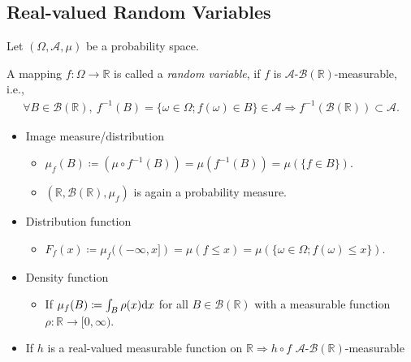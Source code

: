 \documentclass[oneside,11pt]{book}
\numberwithin{equation}{section}
\begin{document}
\subsection{Real-valued Random Variables}
Let $(\Omega,\mathcal{A},\mu)$ be a probability space.

A mapping $f:\Omega\to\mathbb{R}$ is called a \textit{random variable}, if $f$ is $\mathcal{A}$-$\mathcal{B}(\mathbb{R})$-measurable, i.e.,
\begin{align*}
    \forall B\in\mathcal{B}(\mathbb{R}),\ f^{-1}(B) = \{\omega\in\Omega;f(\omega)\in B\}\in\mathcal{A}\Rightarrow f^{-1}(\mathcal{B}(\mathbb{R}))\subset\mathcal{A}.
\end{align*}
\begin{itemize}
    \item Image measure/distribution
    \begin{itemize}
        \item $\mu_f(B)\coloneqq(\mu\circ f^{-1}(B)) = \mu(f^{-1}(B)) = \mu(\{f\in B\})$.
        \item $(\mathbb{R},\mathcal{B}(\mathbb{R}),\mu_f)$ is again a probability measure.
    \end{itemize}
    \item Distribution function
    \begin{itemize}
        \item $F_f(x)\coloneqq\mu_f((-\infty,x]) = \mu(f\le x) = \mu(\{\omega\in\Omega;f(\omega)\le x\})$.
    \end{itemize}
    \item Density function
    \begin{itemize}
        \item If $\mu_f(B)\coloneqq\int_B \rho(x){\rm d}x$ for all $B\in\mathcal{B}(\mathbb{R})$ with a measurable function $\rho:\mathbb{R}\to[0,\infty)$.
    \end{itemize}
    \item If $h$ is a real-valued measurable function on $\mathbb{R}\Rightarrow h\circ f$ $\mathcal{A}$-$\mathcal{B}(\mathbb{R})$-measurable
\end{itemize}
\end{document}
